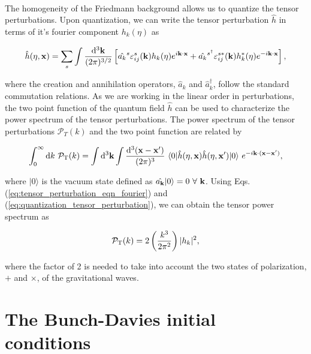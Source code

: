 \documentclass[12pt,a4paper,oneside]{book}
\begin{document}
\paragraph*{} The homogeneity of the Friedmann background allows us 
to quantize the tensor perturbations. Upon quantization, we can write the 
tensor perturbation $\hat{h}$ in terms of it's fourier component 
$h_k(\eta)$ as 

\begin{equation}\label{eq:quantization_tensor_perturbation}
\hat{h}(\eta, {\bf x}) = \sum_s \int \frac{{\rm d}^3\bf{k}}{(2\pi)^{3/2}} 
\left[\hat{a_k}^s\varepsilon^{s}_{ij}({\bf k})h_k(\eta)e^{i\bf{k\cdot x}}
+\hat{a_k}^{s^{\dagger}}\varepsilon^{s*}_{ij}({\bf k})h_k^{*}(\eta)e^{-i\bf{k\cdot x}}\right] ,
\end{equation}

\noindent where the creation and annihilation operators, $\hat{a}_k$ and $\hat{a}_k^{\dagger}$, 
follow the standard commutation relations. As we are working in the linear 
order in perturbations, the two point function of the quantum field $\hat{h}$ 
can be used to characterize the power spectrum of the tensor perturbations. 
The power spectrum of the tensor perturbations $\mathcal{P}_T(k)$ and the 
two point function are related by

\begin{equation}\label{eq:estimation_power_spectrum_fourier}
\int^{\infty}_0 {\rm d}k ~{\mathcal{P}}_{\rm T}(k) = \int {\rm d}^3
{\bf{k}}\int\frac{{\rm d}^3(\bf{x}-\bf{x'})}{(2\pi)^3}~\langle 0|\hat{h}
(\eta,{\bf{x}})\hat{h}(\eta, {\bf{x'}})|0\rangle ~e^{-i{\bf{k \cdot (x-x')}}},
\end{equation}

\noindent where $|0\rangle$ is the vacuum state defined as 
$\hat{a_{\bf k}}|0\rangle = 0 ~\forall ~{\bf k}$. 
Using Eqs. (\ref{eq:tensor_perturbation_eqn_fourier}) and 
(\ref{eq:quantization_tensor_perturbation}), we can obtain 
the tensor power spectrum as

\begin{equation}\label{eq:tensor_power_spectrum}
{\mathcal{P}}_{\rm T}(k) = 2 \left(\frac{k^3}{2\pi^2}\right) |h_k|^2,
\end{equation}

\noindent where the factor of 2 is needed to take into account the two 
states of polarization, $+$ and $\times$, of the gravitational waves.

\section{The Bunch-Davies initial conditions}
\end{document}
